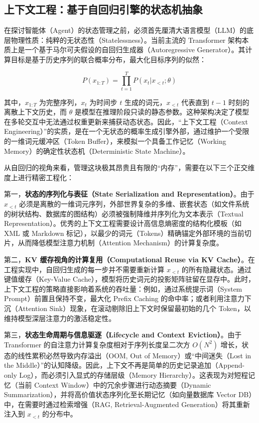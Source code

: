 \subsection{上下文工程：基于自回归引擎的状态机抽象}

在探讨智能体（Agent）的状态管理之前，必须首先厘清大语言模型（LLM）的底层物理性质：纯粹的无状态性（Statelessness）。当前主流的 Transformer 架构本质上是一个基于马尔可夫假设的自回归生成器（Autoregressive Generator）。其计算目标是基于历史序列的联合概率分布，最大化目标序列的似然：

$$ P(x_{1:T}) = \prod_{t=1}^T P(x_t | x_{<t}; \theta) $$

其中，$x_{1:T}$ 为完整序列，$x_t$ 为时间步 $t$ 生成的词元，$x_{<t}$ 代表直到 $t-1$ 时刻的离散上下文历史，而 $\theta$ 是模型在推理阶段只读的静态参数。这种架构决定了模型在多轮交互中无法通过权重更新来捕获动态状态。因此，“上下文工程（Context Engineering）”的实质，是在一个无状态的概率生成引擎外部，通过维护一个受限的一维词元缓冲区（Token Buffer），来模拟一个具备工作记忆（Working Memory）的确定性状态机（Deterministic State Machine）。

从自回归的视角来看，管理这块极其昂贵且有限的“内存”，需要在以下三个正交维度上进行精密工程化：

第一，\textbf{状态的序列化与表征（State Serialization and Representation）}。由于 $x_{<t}$ 必须是离散的一维词元序列，外部世界复杂的多维、嵌套状态（如文件系统的树状结构、数据库的图结构）必须被强制降维并序列化为文本表示（Textual Representation）。优秀的上下文工程需要设计高信息熵密度的结构化模板（如 XML 或 Markdown 标记），以最少的词元（Tokens）精确锚定外部环境的当前切片，从而降低模型注意力机制（Attention Mechanism）的计算复杂度。

第二，\textbf{KV 缓存视角的计算复用（Computational Reuse via KV Cache）}。在工程实现中，自回归生成的每一步并不需要重新计算 $x_{<t}$ 的所有隐藏状态。通过键值缓存（Key-Value Cache），模型将历史词元的投影矩阵驻留在显存中。此时，上下文工程的策略直接影响着系统的吞吐量：例如，通过系统提示词（System Prompt）前置且保持不变，最大化 Prefix Caching 的命中率；或者利用注意力下沉（Attention Sink）现象，在滚动剔除旧上下文时保留最初始的几个 Token，以维持模型深层注意力的激活稳定性。

第三，\textbf{状态生命周期与信息驱逐（Lifecycle and Context Eviction）}。由于 Transformer 的自注意力计算复杂度相对于序列长度呈二次方 $O(N^2)$ 增长，状态的线性累积必然导致内存溢出（OOM, Out of Memory）或“中间迷失（Lost in the Middle）”的认知降级。因此，上下文不再是简单的历史记录追加（Append-only Log），而必须引入显式的存储层级（Memory Hierarchy）。这表现为对短程记忆（当前 Context Window）中的冗余步骤进行动态摘要（Dynamic Summarization），并将高价值状态序列化至长期记忆（如向量数据库 Vector DB）中，在需要时通过检索增强（RAG, Retrieval-Augmented Generation）将其重新注入到 $x_{<t}$ 的分布中。


